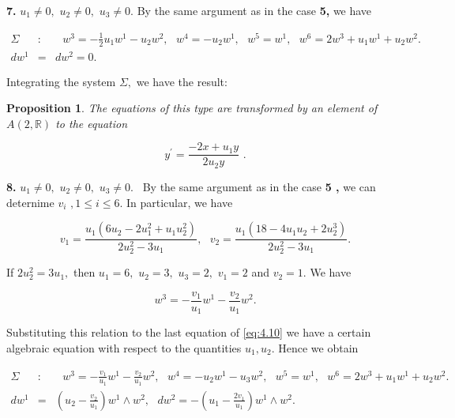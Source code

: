 \documentclass{amsproc}
\newtheorem{proposition}[theorem]{Proposition}
\theoremstyle{remark}
\numberwithin{equation}{section}
\begin{document}
\textbf{7. }$u_{1}\neq 0,$ $u_{2}\neq 0,$ $u_{3}\neq 0.$ By the same
argument as in the case \textbf{5, }we have

\begin{eqnarray*}
\Sigma &:&\text{ }w^{3}=-\frac{1}{2}u_{1}w^{1}-u_{2}w^{2},\text{ }w^{4}=-u_{2}w^{1},\text{ }w^{5}=w^{1},\text{ }w^{6}=2w^{3}+u_{1}w^{1}+u_{2}w^{2}. \\
dw^{1} &=&dw^{2}=0.
\end{eqnarray*}

Integrating the system $\Sigma ,$ we have the result:

\begin{proposition}
The equations of this type are transformed by an element of $A(2,\mathbb{R}
)$ to the equation

\begin{equation*}
y^{\prime }=\frac{-2x+u_{1}y}{2u_{2}y}\text{ \ .}
\end{equation*}
\end{proposition}

\textbf{8. }$u_{1}\neq 0,$ $u_{2}\neq 0,$ $u_{3}\neq 0.$ \ By the same
argument as in the case \textbf{5 , }we can deternime $v_{i}$ $,1\leq i\leq
6.$ In particular, we have

\begin{equation*}
v_{1}=\frac{u_{1}(6u_{2}-2u_{1}^{2}+u_{1}u_{2}^{2})}{2u_{2}^{2}-3u_{1}},\text{ \ }v_{2}=\frac{u_{1}(18-4u_{1}u_{2}+2u_{2}^{3})}{2u_{2}^{2}-3u_{1}}.
\end{equation*}

If $2u_{2}^{2}=3u_{1},$ then $u_{1}=6,$ $u_{2}=3,$ $u_{3}=2,$ $v_{1}=2$ and $v_{2}=1.$ We have

\begin{equation*}
w^{3}=-\frac{v_{1}}{u_{1}}w^{1}-\frac{v_{2}}{u_{1}}w^{2}.
\end{equation*}

Substituting this relation to the last equation of \eqref{eq:4.10} we have a
certain algebraic equation with respect to the quantities $u_{1},u_{2}.$
Hence we obtain

\begin{eqnarray*}
\Sigma &:&\text{ }w^{3}=-\frac{v_{1}}{u_{1}}w^{1}-\frac{v_{2}}{u_{1}}w^{2},\text{ }w^{4}=-u_{2}w^{1}-u_{3}w^{2},\text{ }w^{5}=w^{1},\text{ }w^{6}=2w^{3}+u_{1}w^{1}+u_{2}w^{2}. \\
dw^{1} &=&(u_{2}-\frac{v_{2}}{u_{1}})w^{1}\wedge w^{2},\text{ \ \ }dw^{2}=-(u_{1}-\frac{2v_{1}}{u_{1}})w^{1}\wedge w^{2}.
\end{eqnarray*}
\end{document}
